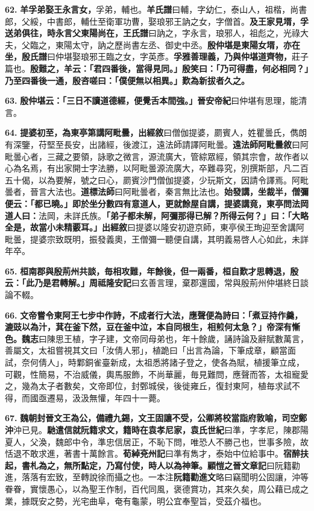 \textbf{62.} \textbf{羊孚弟娶王永言女，}{\footnotesize 孚弟，輔也。\textbf{羊氏譜}曰輔，字幼仁，泰山人，祖楷，尚書郎，父綏，中書郎，輔仕至衛軍功曹，娶琅邪王訥之女，字僧首。}\textbf{及王家見壻，孚送弟俱往，時永言父東陽尚在，}{\footnotesize \textbf{王氏譜}曰訥之，字永言，琅邪人，祖彪之，光祿大夫，父臨之，東陽太守，訥之歷尚書左丞、御史中丞。}\textbf{殷仲堪是東陽女壻，亦在坐，}{\footnotesize \textbf{殷氏譜}曰仲堪娶琅邪王臨之女，字英彥。}\textbf{孚雅善理義，乃與仲堪道齊物，}{\footnotesize 莊子篇也。}\textbf{殷難之，羊云：「君四番後，當得見同。」殷笑曰：「乃可得盡，何必相同？」乃至四番後一通，殷咨嗟曰：「僕便無以相異。」歎為新拔者久之。}

\textbf{63.} \textbf{殷仲堪云：「三日不讀道德經，便覺舌本間強。」}{\footnotesize \textbf{晉安帝紀}曰仲堪有思理，能清言。}

\textbf{64.} \textbf{提婆初至，為東亭第講阿毗曇，}{\footnotesize \textbf{出經敘}曰僧伽提婆，罽賓人，姓瞿曇氏，儁朗有深鑒，苻堅至長安，出諸經，後渡江，遠法師請譯阿毗曇。\textbf{遠法師阿毗曇敘}曰阿毗曇心者，三藏之要領，詠歌之微言，源流廣大，管綜眾經，領其宗會，故作者以心為名焉，有出家開士字法勝，以阿毗曇源流廣大，卒難尋究，別撰斯部，凡二百五十偈，以為要解，號之曰心，罽賓沙門僧伽提婆，少玩斯文，因請令譯焉。阿毗曇者，晉言大法也。\textbf{道標法師}曰阿毗曇者，秦言無比法也。}\textbf{始發講，坐裁半，僧彌便云：「都已曉。」即於坐分數四有意道人，更就餘屋自講，提婆講竟，東亭問法岡道人曰：}{\footnotesize 法岡，未詳氏族。}\textbf{「弟子都未解，阿彌那得已解？所得云何？」曰：「大略全是，故當小未精覈耳。」}{\footnotesize \textbf{出經敘}曰提婆以隆安初遊京師，東亭侯王珣迎至舍講阿毗曇，提婆宗致既明，振發義奧，王僧彌一聽便自講，其明義易啓人心如此，未詳年卒。}

\textbf{65.} \textbf{桓南郡與殷荊州共談，毎相攻難，年餘後，但一兩番，桓自歎才思轉退，殷云：「此乃是君轉解。」}{\footnotesize \textbf{周祗隆安記}曰玄善言理，棄郡還國，常與殷荊州仲堪終日談論不輟。}

\textbf{66.} \textbf{文帝嘗令東阿王七步中作詩，不成者行大法，應聲便為詩曰：「煮豆持作羹，漉豉以為汁，萁在釜下然，豆在釜中泣，本自同根生，相煎何太急？」帝深有慚色。}{\footnotesize \textbf{魏志}曰陳思王植，字子建，文帝同母弟也，年十餘歲，誦詩論及辭賦數萬言，善屬文，太祖嘗視其文曰「汝倩人邪」，植跪曰「出言為論，下筆成章，顧當面試，奈何倩人」，時鄴銅雀臺新成，太祖悉將諸子登之，使各為賦，植援筆立成，可觀，性簡易，不治威儀，輿馬服飾，不尚華麗，毎見難問，應聲而答，太祖寵愛之，幾為太子者數矣，文帝即位，封鄄城侯，後徙雍丘，復封東阿，植毎求試不得，而國亟遷易，汲汲無懽，年四十一薨。}

\textbf{67.} \textbf{魏朝封晉文王為公，備禮九錫，文王固讓不受，公卿將校當詣府敦喻，司空鄭沖}{\footnotesize 沖已見。}\textbf{馳遣信就阮籍求文，籍時在袁孝尼家，}{\footnotesize \textbf{袁氏世紀}曰準，字孝尼，陳郡陽夏人，父渙，魏郎中令，準忠信居正，不恥下問，唯恐人不勝己也，世事多險，故恬退不敢求進，著書十萬餘言。\textbf{荀綽兗州記}曰準有雋才，泰始中位給事中。}\textbf{宿醉扶起，書札為之，無所點定，乃寫付使，時人以為神筆。}{\footnotesize \textbf{顧愷之晉文章記}曰阮籍勸進，落落有宏致，至轉說徐而攝之也。一本注\textbf{阮籍勸進文}略曰竊聞明公固讓，沖等眷眷，實懷愚心，以為聖王作制，百代同風，褒德賞功，其來久矣，周公藉已成之業，據既安之勢，光宅曲阜，奄有龜蒙，明公宜奉聖旨，受茲介福也。}

